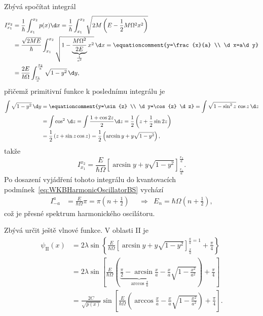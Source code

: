 \begin{solution}
	Zbývá spočítat integrál
	\begin{align}
		I_{x_{1}}^{x_{2}}
			&=\frac{1}{\hbar}\int_{x_{1}}^{x_{2}}p(x)\d x=\frac{1}{\hbar}\int_{x_{1}}^{x_{2}}\sqrt{2M\left(E-\frac{1}{2}M\Omega^{2}x^{2}\right)}\nonumber\\
			&=\frac{\sqrt{2ME}}{\hbar}\int_{x_{1}}^{x_{2}}\sqrt{1-\underbrace{\frac{M\Omega^{2}}{2E}}_{\frac{1}{a^{2}}}x^{2}}\,\d x=\equationcomment{y=\frac{x}{a} \\ \d x=a\d y}\nonumber\\
			&=\frac{2E}{\hbar\Omega}\int_{\frac{x_{1}}{a}}^{\frac{x_{2}}{a}}\sqrt{1-y^{2}}\,\d y,
	\end{align}
	přičemž primitivní funkce k poslednímu integrálu je
	\begin{align}
		\int\sqrt{1-y^{2}}\,\d y
			&=\equationcomment{y=\sin{z} \\ \d y=\cos{z} \d z}=\int\sqrt{1-\sin^{2}z}\,\cos{z}\,\d z\nonumber\\
			&=\int\cos^{2}\,\d z=\int\frac{1+\cos{2z}}{2}\d z=\frac{1}{2}\left(z+\frac{1}{2}\sin{2z}\right)\nonumber\\
			&=\frac{1}{2}\left(z+\sin{z}\cos{z}\right)=\frac{1}{2}\left(\arcsin{y}+y\sqrt{1-y^{2}}\right),
			\label{eq:intsqrt}
	\end{align}
	takže
	\begin{equation}
		I_{x_{1}}^{x_{2}}=\frac{E}{\hbar\Omega}\left[\arcsin{y}+y\sqrt{1-y^{2}}\right]_{\frac{x_{1}}{a}}^{\frac{x_{2}}{a}}.
	\end{equation}
	Po dosazení vyjádření tohoto integrálu do kvantovacích podmínek~\eqref{eq:WKBHarmonicOscillatorBS} vychází
	\begin{align}
		I_{-a}^{a}&=\frac{E}{\hbar\Omega}\pi=\pi\left(n+\frac{1}{2}\right) && \Longrightarrow & E_{n}=\hbar\Omega\left(n+\frac{1}{2}\right),
	\end{align}
	což je přesné spektrum harmonického oscilátoru.

	Zbývá určit ještě vlnové funkce.
	V oblasti II je
	\begin{align}
		\psi_{\mathrm{II}}(x)
			&=2\lambda\sin{\left\{\frac{E}{\hbar\Omega}\left[\arcsin{y}+y\sqrt{1-y^{2}}\right]_{\frac{x}{a}}^{\frac{a}{a}=1}+\frac{\pi}{4}\right\}}\nonumber\\
			&=2\lambda\sin{\left[\frac{E}{\hbar\Omega}\left(\underbrace{\frac{\pi}{2}-\arcsin{\frac{x}{a}}}_{\arccos{\frac{x}{a}}}-\frac{x}{a}\sqrt{1-\frac{x^{2}}{a^{2}}}\right)+\frac{\pi}{4}\right]}\nonumber\\
			&=\frac{2C}{\sqrt{p(x)}}\sin\left[\frac{E}{\hbar\Omega}\left(\arccos{\frac{x}{a}}-\frac{x}{a}\sqrt{1-\frac{x^{2}}{a^{2}}}\right)+\frac{\pi}{4}\right].
	\end{align}
	

\end{solution}
